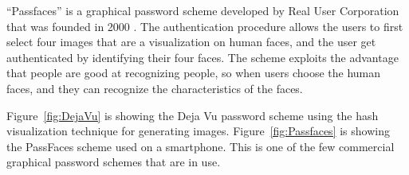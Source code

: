   ``Passfaces'' is a graphical password scheme developed by Real User Corporation that was founded in 2000 \cite{passface}. The authentication procedure allows the users to first select four images that are a visualization on human faces, and the user get authenticated by identifying their four faces. The scheme exploits the advantage that people are good at recognizing people, so when users choose the human faces, and they can recognize the characteristics of the faces.

  Figure~\ref{fig:DejaVu} is showing the Deja Vu password scheme using the hash visualization technique for generating images. Figure~\ref{fig:Passfaces} is showing the PassFaces scheme used on a smartphone. This is one of the few commercial graphical password schemes that are in use.

  \begin{figure}[H]
    \centering
    \ContinuedFloat
  \end{figure}

